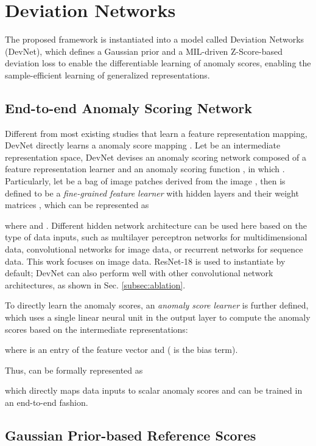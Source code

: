 \documentclass[10pt,journal,compsoc]{IEEEtran}
\begin{document}
\section{Deviation Networks}

The proposed framework is instantiated into a model called Deviation Networks (DevNet), which defines a Gaussian prior and a MIL-driven Z-Score-based deviation loss to enable the differentiable learning of anomaly scores, enabling the sample-efficient learning of generalized representations.

\subsection{End-to-end Anomaly Scoring Network}\label{subsec:score_network}
Different from most existing studies that learn a feature representation mapping, DevNet directly learns a anomaly score mapping . Let  be an intermediate representation space, DevNet devises an anomaly scoring network  composed of a feature representation learner  and an anomaly scoring function , in which . Particularly, let  be a bag of image patches derived from the image , then  is defined to be a \textit{fine-grained feature learner} with  hidden layers and their weight matrices , which can be represented as

where  and . Different hidden network architecture can be used here based on the type of data inputs, such as multilayer perceptron networks for multidimensional data, convolutional networks for image data, or recurrent networks for sequence data. This work focuses on image data. ResNet-18 \cite{he2016deep} is used to instantiate  by default; DevNet can also perform well with other convolutional network architectures, as shown in Sec. \ref{subsec:ablation}.

To directly learn the anomaly scores, an \textit{anomaly score learner}  is further defined, which uses a single linear neural unit in the output layer to compute the anomaly scores based on the intermediate representations:

where  is an entry of the feature vector  and  ( is the bias term).


Thus,  can be formally represented as 

which directly maps data inputs to scalar anomaly scores and can be trained in an end-to-end fashion.

\subsection{Gaussian Prior-based Reference Scores}\label{subsec:reference}
\end{document}
